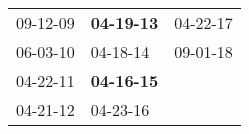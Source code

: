 \begin{supertabular}{p{0.33\columnwidth}p{0.33\columnwidth}p{0.33\columnwidth}}
 09-12-09\textsuperscript{} &  \textbf{04-19-13\textsuperscript{}} &  04-22-17\textsuperscript{} \\
 06-03-10\textsuperscript{} &           04-18-14\textsuperscript{} &  09-01-18\textsuperscript{} \\
 04-22-11\textsuperscript{} &  \textbf{04-16-15\textsuperscript{}} &                             \\
 04-21-12\textsuperscript{} &           04-23-16\textsuperscript{} &                             \\
\end{supertabular}

